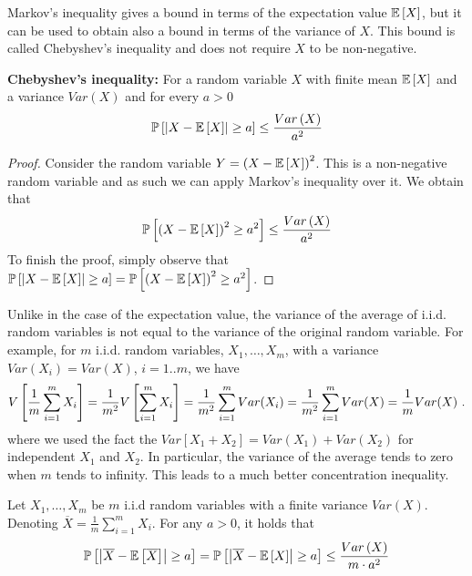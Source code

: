 Markov's inequality gives a bound in terms of the expectation value $\mathbb{E}\left[X\right]$, but it can be used to obtain also a bound in terms of the variance of $X$. This bound is called Chebyshev's inequality and does not require $X$ to be non-negative.  
\begin{theorem} \textbf{Chebyshev's inequality:} For a random variable $X$ with finite mean  $\mathbb{E}\left[X\right]$ and a variance $Var\left(X\right)$ and for every $ a> 0$ $$	\mathbb{P}\left[\left|X-\mathbb{E} \left[X\right]\right| \geq a\right] \leq \frac{Var\left(X\right)}{a^2}$$
\end{theorem}
\begin{proof}
Consider the random variable $Y=\left(X-\mathbb{E}\left[X\right]\right)^2$. This is a non-negative random variable and as such we can apply Markov's inequality over it. We obtain that $$\mathbb{P}\left[\left(X-\mathbb{E} \left[X\right]\right)^2 \geq a^2\right] \leq \frac{Var\left(X\right)}{a^2}$$
To finish the proof, simply observe that $\mathbb{P}\left[\left|X-\mathbb{E}\left[X\right]\right| \geq a\right] = \mathbb{P}\left[\left(X-\mathbb{E}\left[X\right]\right)^2 \geq a^2\right]$.
\end{proof}
Unlike in the case of the expectation value, the variance of the average of i.i.d. random variables is not equal to the variance of the original random variable. 
For example, for $m$ i.i.d. random variables, $X_1,\ldots, X_m$, with a variance $Var(X_i)=Var(X)$, $i=1..m$,  we have
\begin{align} \label{eq:varAve}
	V \left[\frac{1}{m} \sum_{i=1} ^m X_i \right] = 
	\frac{1}{m^2} V \left[\sum_{i=1} ^m X_i \right] \notag 
	= \frac{1}{m^2} \sum_{i=1} ^m Var(X_i) \notag 
	= \frac{1}{m^2} \sum_{i=1} ^m Var(X) \notag
	= \frac{1}{m} Var(X)~.
\end{align}
where we used the fact the  $ Var \left[X_1+X_2 \right] = Var\left(X_1\right)+Var\left(X_2\right)$ for independent $X_1$ and $X_2$.
In particular, the variance of the average tends to zero when $m$ tends to infinity. This leads to a much better concentration inequality.
\begin{corollary} \label{cor:chebysevAve}
Let $X_1,\ldots,X_m$ be $m$ i.i.d random variables with a finite variance $Var\left(X\right)$. Denoting $\overline{X}=\frac{1}{m} \sum_{i=1} ^m X_i$. For any $a>0$, it holds that $$\mathbb{P} \left[\left|\overline{X}-\mathbb{E} \left[\overline{X}\right]\right| \geq a\right] = \mathbb{P} \left[\left|\overline{X}-\mathbb{E} \left[X\right]\right| \geq a\right] \leq \frac{Var\left(X\right)}{m\cdot a^2}$$
\end{corollary}

